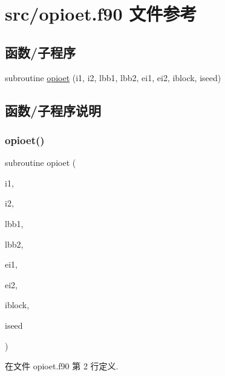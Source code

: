 \hypertarget{opioet_8f90}{}\section{src/opioet.f90 文件参考}
\label{opioet_8f90}
\subsection*{函数/子程序}
\begin{DoxyCompactItemize}
\item 
subroutine \mbox{\hyperlink{opioet_8f90_aae72d2f9bafd8f19c95ee9beba68a69c}{opioet}} (i1, i2, lbb1, lbb2, ei1, ei2, iblock, iseed)
\end{DoxyCompactItemize}


\subsection{函数/子程序说明}
\mbox{\label{opioet_8f90_aae72d2f9bafd8f19c95ee9beba68a69c}} 
\subsubsection{\texorpdfstring{opioet()}{opioet()}}
{\footnotesize\ttfamily subroutine opioet (\begin{DoxyParamCaption}\item[{}]{i1,  }\item[{}]{i2,  }\item[{}]{lbb1,  }\item[{}]{lbb2,  }\item[{}]{ei1,  }\item[{}]{ei2,  }\item[{}]{iblock,  }\item[{}]{iseed }\end{DoxyParamCaption})}



在文件 opioet.\+f90 第 2 行定义.

